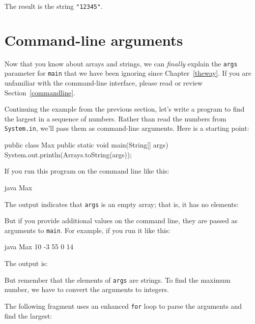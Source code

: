 \documentclass[12pt]{book}
\theoremstyle{exercise}
\newcommand{\java}[1]{\verb"#1"}
\begin{document}
The result is the string \verb|"12345"|.


\section{Command-line arguments}

Now that you know about arrays and strings, we can {\em finally} explain the \java{args} parameter for \java{main} that we have been ignoring since Chapter~\ref{theway}.
If you are unfamiliar with the command-line interface, please read or review Section~\ref{commandline}.

Continuing the example from the previous section, let's write a program to find the largest in a sequence of numbers.
Rather than read the numbers from \java{System.in}, we'll pass them as command-line arguments.
Here is a starting point:

\begin{code}
public class Max {
    public static void main(String[] args) {
        System.out.println(Arrays.toString(args));
    }
}
\end{code}

If you run this program on the command line like this:

\begin{code}
java Max
\end{code}


The output indicates that \java{args} is an empty array; that is, it has no elements:

\begin{stdout}
[]
\end{stdout}

But if you provide additional values on the command line, they are passed as arguments to \java{main}.
For example, if you run it like this:

\begin{stdout}
java Max 10 -3 55 0 14
\end{stdout}

The output is:

\begin{stdout}
[10, -3, 55, 0, 14]
\end{stdout}

But remember that the elements of \java{args} are strings.
To find the maximum number, we have to convert the arguments to integers.

The following fragment uses an enhanced \java{for} loop to parse the arguments and find the largest:
\end{document}
